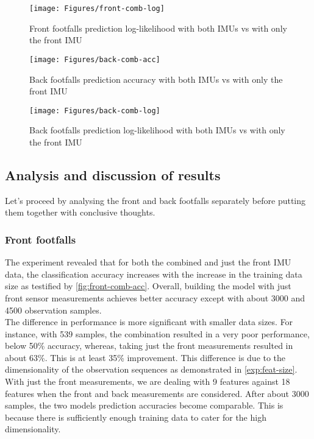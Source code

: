 \begin{figure}[ht!]
	\texttt{[image: Figures/front-comb-log]}
	\caption{Front footfalls prediction log-likelihood with both IMUs vs with only the front IMU}
	\label{fig:front-comb-log}
\end{figure}

\begin{figure}[ht!]
	\texttt{[image: Figures/back-comb-acc]}
	\caption{Back footfalls prediction accuracy with both IMUs vs with only the front IMU}
	\label{fig:back-comb-acc}
\end{figure}

\begin{figure}[ht!]
	\texttt{[image: Figures/back-comb-log]}
	\caption{Back footfalls prediction log-likelihood with both IMUs vs with only the front IMU}
	\label{fig:back-comb-log}
\end{figure}


\subsection{Analysis and discussion of results}

Let's proceed by analysing the front and back footfalls separately before putting them together with conclusive thoughts.

\subsubsection{Front footfalls}
The experiment revealed that for both the combined and just the front IMU data, the classification accuracy increases with the increase in the training data size as testified by \ref{fig:front-comb-acc}. Overall, building the model with just front sensor measurements achieves better accuracy except with about 3000 and 4500 observation samples.\\
The difference in performance is more significant with smaller data sizes. For instance, with 539 samples, the combination resulted in a very poor performance, below 50\% accuracy, whereas, taking just the front measurements resulted in about 63\%. This is at least 35\% improvement.
This difference is due to the dimensionality of the observation sequences as demonstrated in \ref{exp:feat-size}. With just the front measurements, we are dealing with 9 features against 18 features when the front and back measurements are considered.
After about 3000 samples, the two models prediction accuracies become comparable. This is because there is sufficiently enough training data to cater for the high dimensionality.\\\\

